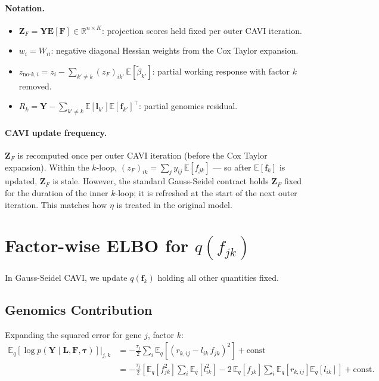 \documentclass[11pt]{article}
\newcommand{\E}{\mathbb{E}}
\begin{document}
\paragraph{Notation.}
\begin{itemize}
  \item $\mathbf{Z}_F = \mathbf{Y}\mathbf{E}[\mathbf{F}] \in \mathbb{R}^{n\times K}$: projection
        scores held fixed per outer CAVI iteration.
  \item $w_i = W_{ii}$: negative diagonal Hessian weights from the Cox Taylor expansion.
  \item $z_{\text{no-}k,i} = z_i - \sum_{k'\ne k}(z_F)_{ik'}\,\E[\tilde\beta_{k'}]$:
        partial working response with factor $k$ removed.
  \item $R_k = \mathbf{Y} - \sum_{k'\ne k}\E[\mathbf{l}_{k'}]\E[\mathbf{f}_{k'}]^\top$:
        partial genomics residual.
\end{itemize}

\paragraph{CAVI update frequency.}
$\mathbf{Z}_F$ is recomputed once per outer CAVI iteration (before the Cox Taylor expansion).
Within the $k$-loop, $(z_F)_{ik} = \sum_j y_{ij}\,\E[f_{jk}]$ — so after $\E[\mathbf{f}_k]$
is updated, $\mathbf{Z}_F$ is stale. However, the standard Gauss-Seidel contract holds
$\mathbf{Z}_F$ fixed for the duration of the inner $k$-loop; it is refreshed at the start
of the next outer iteration. This matches how $\eta$ is treated in the original model.

\section{Factor-wise ELBO for $q(f_{jk})$}

In Gauss-Seidel CAVI, we update $q(\mathbf{f}_k)$ holding all other quantities fixed.

\subsection{Genomics Contribution}

Expanding the squared error for gene $j$, factor $k$:
\begin{align}
  \E_q[\log p(\mathbf{Y} \mid \mathbf{L}, \mathbf{F}, \boldsymbol{\tau})] \Big|_{j,k}
  &= -\frac{\tau_j}{2}\sum_i \E_q[(r_{k,ij} - l_{ik}\,f_{jk})^2] + \text{const}\nonumber\\
  &= -\frac{\tau_j}{2}\!\left[\E_q[f_{jk}^2]\!\sum_i \E_q[l_{ik}^2]
     - 2\,\E_q[f_{jk}]\!\sum_i \E_q[r_{k,ij}]\E_q[l_{ik}]\right] + \text{const}.
\end{align}
\end{document}

